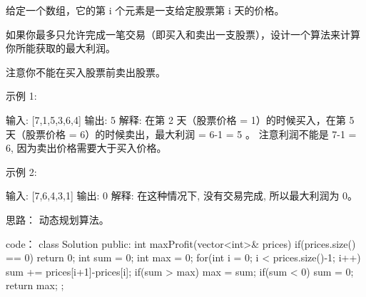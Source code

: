 给定一个数组，它的第 i 个元素是一支给定股票第 i 天的价格。

如果你最多只允许完成一笔交易（即买入和卖出一支股票），设计一个算法来计算你所能获取的最大利润。

注意你不能在买入股票前卖出股票。

示例 1:

输入: [7,1,5,3,6,4]
输出: 5
解释: 在第 2 天（股票价格 = 1）的时候买入，在第 5 天（股票价格 = 6）的时候卖出，最大利润 = 6-1 = 5 。
     注意利润不能是 7-1 = 6, 因为卖出价格需要大于买入价格。

示例 2:

输入: [7,6,4,3,1]
输出: 0
解释: 在这种情况下, 没有交易完成, 所以最大利润为 0。





















思路：
动态规划算法。























code：
class Solution {
public:
    int maxProfit(vector<int>& prices) {
        if(prices.size() == 0) return 0;
        int sum = 0;
        int max = 0;
        for(int i = 0; i < prices.size()-1; i++)
        {
            sum += prices[i+1]-prices[i];
            if(sum > max) max = sum;
            if(sum < 0) sum = 0;
        }
        return max;
    }
};